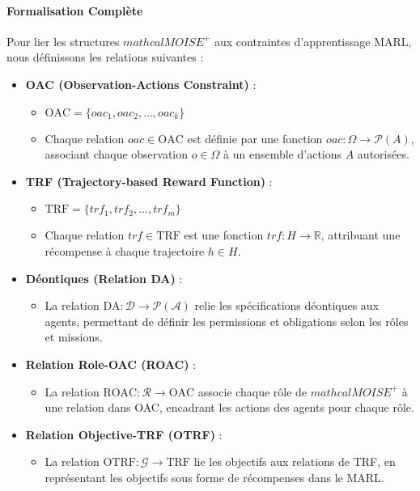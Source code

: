 \documentclass[sigconf,anonymous]{aamas}
\begin{document}
\paragraph{Formalisation Complète}

Pour lier les structures $mathcal{M}OISE^+$ aux contraintes d'apprentissage MARL, nous définissons les relations suivantes :

\begin{itemize}
    \item \textbf{OAC (Observation-Actions Constraint)} : 
    \begin{itemize}
        \item $\text{OAC} = \{ oac_1, oac_2, \dots, oac_k \}$
        \item Chaque relation \( oac \in \text{OAC} \) est définie par une fonction \( oac: \Omega \rightarrow \mathcal{P}(A) \), associant chaque observation \( o \in \Omega \) à un ensemble d'actions \( A \) autorisées.
    \end{itemize}
    \item \textbf{TRF (Trajectory-based Reward Function)} : 
    \begin{itemize}
        \item $\text{TRF} = \{ trf_1, trf_2, \dots, trf_m \}$
        \item Chaque relation \( trf \in \text{TRF} \) est une fonction \( trf: H \rightarrow \mathbb{R} \), attribuant une récompense à chaque trajectoire \( h \in H \).
    \end{itemize}
    \item \textbf{Déontiques (Relation DA)} :
    \begin{itemize}
        \item La relation \( \text{DA}: \mathcal{D} \rightarrow \mathcal{P}(\mathcal{A}) \) relie les spécifications déontiques aux agents, permettant de définir les permissions et obligations selon les rôles et missions.
    \end{itemize}
    \item \textbf{Relation Role-OAC (ROAC)} :
    \begin{itemize}
        \item La relation \( \text{ROAC}: \mathcal{R} \rightarrow \text{OAC} \) associe chaque rôle de $mathcal{M}OISE^+$ à une relation dans OAC, encadrant les actions des agents pour chaque rôle.
    \end{itemize}
    \item \textbf{Relation Objective-TRF (OTRF)} :
    \begin{itemize}
        \item La relation \( \text{OTRF}: \mathcal{G} \rightarrow \text{TRF} \) lie les objectifs aux relations de TRF, en représentant les objectifs sous forme de récompenses dans le MARL.
    \end{itemize}
\end{itemize}
\end{document}

